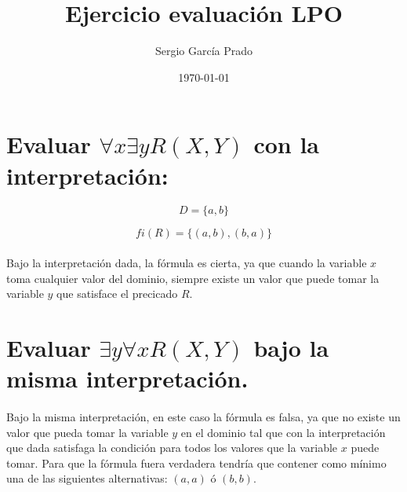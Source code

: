 \documentclass[10pt, a4paper,spanish]{article}
\title{\vspace{-15mm}\fontsize{24pt}{10pt}\selectfont\textbf{Ejercicio evaluación LPO}} %
\author{Sergio García Prado}
\date{\today}
\begin{document}
	\maketitle %

	\thispagestyle{fancy} %


	\section{Evaluar   $\forall x \exists y R(X,Y)$   con la interpretación:}

	    \begin{equation}
	        D=\{a, b\}
		\end{equation}

		\begin{equation}
	        fi(R)=\{(a, b), (b,a)\}
	    \end{equation}

	    \paragraph{}
		Bajo la interpretación dada, la fórmula es cierta, ya que cuando la variable $x$ toma cualquier valor del dominio, siempre existe un valor que puede tomar la variable $y$ que satisface el precicado $R$.

	\section{Evaluar  $\exists y \forall x R(X,Y)$  bajo la misma interpretación.}

		\paragraph{}
		Bajo la misma interpretación, en este caso la fórmula es falsa, ya que no existe un valor que pueda tomar la variable $y$ en el dominio tal que con la interpretación que dada satisfaga la condición para todos los valores que la variable $x$ puede tomar. Para que la fórmula fuera verdadera tendría que contener como mínimo una de las siguientes alternativas: $(a,a)$ ó $(b,b)$.
\end{document}
